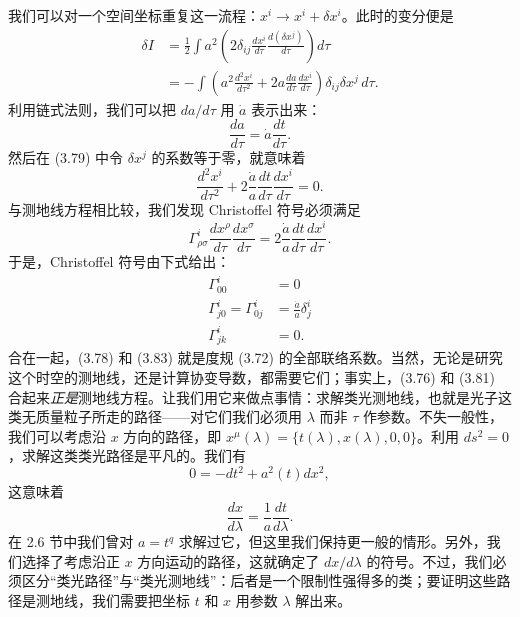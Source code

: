 我们可以对一个空间坐标重复这一流程：$x^i \rightarrow x^i + \delta x^i$。此时的变分便是
\begin{align*}
\delta I &= \frac{1}{2}\int a^2\left(2\delta_{ij}\frac{dx^i}{d\tau}\frac{d(\delta x^j)}{d\tau}\right)d\tau\\
&= -\int\left(a^2\frac{d^2x^i}{d\tau^2} + 2a\frac{da}{d\tau}\frac{dx^i}{d\tau}\right)\delta_{ij}\delta x^j\,d\tau.
\tag{3.79}
\end{align*}
利用链式法则，我们可以把 $da/d\tau$ 用 $\dot{a}$ 表示出来：
\begin{equation*}
\frac{da}{d\tau} = \dot{a}\frac{dt}{d\tau}.
\tag{3.80}
\end{equation*}
然后在 (3.79) 中令 $\delta x^j$ 的系数等于零，就意味着
\begin{equation*}
\frac{d^2x^i}{d\tau^2} + 2\frac{\dot{a}}{a}\frac{dt}{d\tau}\frac{dx^i}{d\tau} = 0.
\tag{3.81}
\end{equation*}
与测地线方程相比较，我们发现 Christoffel 符号必须满足
\begin{equation*}
\Gamma^i_{\rho\sigma}\frac{dx^\rho}{d\tau}\frac{dx^\sigma}{d\tau} = 2\frac{\dot{a}}{a}\frac{dt}{d\tau}\frac{dx^i}{d\tau}.
\tag{3.82}
\end{equation*}
于是，Christoffel 符号由下式给出：
\begin{align*}
\Gamma^i_{00} &= 0\\
\Gamma^i_{j0} = \Gamma^i_{0j} &= \frac{\dot{a}}{a}\delta^i_j\\
\Gamma^i_{jk} &= 0.
\tag{3.83}
\end{align*}
合在一起，(3.78) 和 (3.83) 就是度规 (3.72) 的全部联络系数。当然，无论是研究这个时空的测地线，还是计算协变导数，都需要它们；事实上，(3.76) 和 (3.81) 合起来\emph{正是}测地线方程。让我们用它来做点事情：求解类光测地线，也就是光子这类无质量粒子所走的路径——对它们我们必须用 $\lambda$ 而非 $\tau$ 作参数。不失一般性，我们可以考虑沿 $x$ 方向的路径，即 $x^\mu(\lambda) = \{t(\lambda), x(\lambda), 0, 0\}$。利用 $ds^2 = 0$，求解这类类光路径是平凡的。我们有
\begin{equation*}
0 = -dt^2 + a^2(t)dx^2,
\tag{3.84}
\end{equation*}
这意味着
\begin{equation*}
\frac{dx}{d\lambda} = \frac{1}{a}\frac{dt}{d\lambda}.
\tag{3.85}
\end{equation*}
在 2.6 节中我们曾对 $a = t^q$ 求解过它，但这里我们保持更一般的情形。另外，我们选择了考虑沿正 $x$ 方向运动的路径，这就确定了 $dx/d\lambda$ 的符号。不过，我们必须区分“类光路径”与“类光测地线”：后者是一个限制性强得多的类；要证明这些路径是测地线，我们需要把坐标 $t$ 和 $x$ 用参数 $\lambda$ 解出来。

